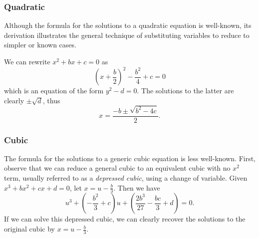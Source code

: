 \documentclass{article} %
\theoremstyle{plain}
\theoremstyle{definition}
\begin{document}
\subsubsection{Quadratic}
\label{sec:intro:quadratic}

Although the formula for the solutions
to a quadratic equation is well-known,
its derivation illustrates the general technique
of substituting variables to reduce to simpler or known cases.

We can rewrite $x^2 + bx + c = 0$ as
\[
\left(x + \frac{b}{2}\right)^2 - \frac{b^2}{4} + c = 0
\]
which is an equation of the form $y^2 - d = 0$.
The solutions to the latter are clearly $\pm \sqrt{d}$,
thus
\begin{equation}\label{quadr-sol}
x = \frac {-b \pm \sqrt{b^2 - 4c}}{2}.
\end{equation}


\subsubsection{Cubic}
\label{sec:intro:cubic}

The formula for the solutions to a generic cubic equation is less well-known.
First, observe that we can reduce a general cubic to an equivalent cubic with no $x^2$ term, usually referred to as a \emph{depressed cubic}, using a change of variable.
Given $x^3 + bx^2 + cx + d = 0$, let $x = u - \frac{b}{3}$.
Then we have
\[
u^3 + \left(-\frac{b^2}{3} + c\right)u
	+ \left(\frac{2b^3}{27} - \frac{bc}{3} + d\right)
=0.
\]
If we can solve this depressed cubic,
we can clearly recover the solutions to the original cubic
by $x = u - \frac{b}{3}$.
\end{document}
